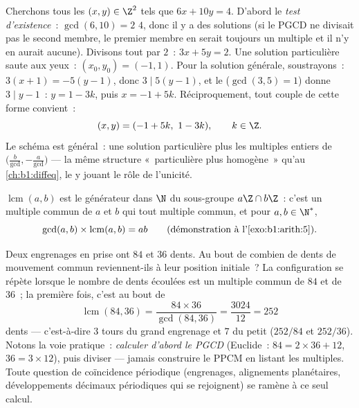 \begin{example}\label{ex:b1:arith:diophantine}
Cherchons tous les $(x, y) \in \Z^2$ tels que $6x + 10y = 4$. D'abord le
\emph{test d'existence}~: $\gcd(6, 10) = 2$  $4$, donc il y a des
solutions (si le PGCD ne divisait pas le second membre, le premier
membre en serait toujours un multiple et il n'y en aurait aucune).
Divisons tout par $2$~: $3x + 5y = 2$. Une solution particulière saute aux
yeux~: $(x_0, y_0) = (-1, 1)$. Pour la solution générale, soustrayons~:
$3(x + 1) = -5(y - 1)$, donc $3 \mid 5(y-1)$, et le 
($\gcd(3,5) = 1$) donne $3 \mid y - 1$~: $y = 1 - 3k$, puis $x = -1 + 5k$.
Réciproquement, tout couple de cette forme convient~:
\[
(x, y) = (-1 + 5k,\ 1 - 3k), \qquad k \in \Z .
\]
Le schéma est général~: une solution particulière plus les multiples
entiers de $\bigl(\frac b{\gcd}, -\frac a{\gcd}\bigr)$ --- la
même structure «~particulière plus homogène~» qu'au
\cref{ch:b1:diffeq}, le  y jouant le rôle de
l'unicité.
\end{example}

\begin{definition}\label{def:b1:arith:lcm}
$\operatorname{lcm}(a, b)$ est le
générateur dans $\N$ du sous-groupe $a\Z \cap b\Z$~: c'est un multiple
commun de $a$ et $b$ qui  tout multiple commun, et pour
$a, b \in \N^*$,
\[
\gcd(a,b) \times \operatorname{lcm}(a,b) = ab
\qquad (\text{démonstration à l'} \cref{exo:b1:arith:5}).
\]
\end{definition}

\begin{example}\label{ex:b1:arith:gears}
Deux engrenages en prise ont $84$ et $36$ dents. Au bout de combien de
dents de mouvement commun reviennent-ils  à leur position initiale~?
La configuration se répète lorsque le nombre de dents écoulées est un
multiple commun de $84$ et de $36$~; la première fois, c'est au bout de
\[
\operatorname{lcm}(84, 36) = \frac{84 \times 36}{\gcd(84, 36)}
= \frac{3024}{12} = 252
\]
dents --- c'est-à-dire $3$ tours du grand engrenage et $7$ du
petit ($252/84$ et $252/36$). Notons la voie pratique~:
\emph{calculer d'abord le PGCD} (Euclide~: $84 = 2\times36 + 12$, $36
= 3\times12$), puis diviser --- jamais construire le PPCM en listant les
multiples. Toute question de coïncidence périodique (engrenages,
alignements planétaires, développements décimaux périodiques qui se
rejoignent) se ramène à ce seul calcul.
\end{example}

